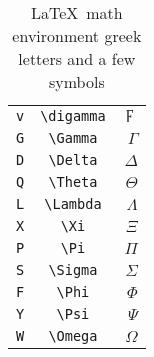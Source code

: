 \documentclass[a4paper,11pt]{scrartcl}
\begin{document}
\begin{table}[tb]
\begin{center}
\begin{tabular}{lcr}
    \verb|v|                     &    \verb|\digamma|                                             &    $\digamma$  \\
    \verb|G|                     &    \verb|\Gamma|                                               &    $\Gamma$  \\
    \verb|D|                     &    \verb|\Delta|                                               &    $\Delta$  \\
    \verb|Q|                     &    \verb|\Theta|                                               &    $\Theta$  \\
    \verb|L|                     &    \verb|\Lambda|                                              &    $\Lambda$  \\
    \verb|X|                     &    \verb|\Xi|                                                  &    $\Xi$  \\
    \verb|P|                     &    \verb|\Pi|                                                  &    $\Pi$  \\
    \verb|S|                     &    \verb|\Sigma|                                               &    $\Sigma$  \\
    \verb|F|                     &    \verb|\Phi|                                                 &    $\Phi$  \\
    \verb|Y|                     &    \verb|\Psi|                                                 &    $\Psi$  \\
    \verb|W|                     &    \verb|\Omega|                                               &    $\Omega$  \\
    \hline
    \end{tabular}
  \end{center}
  \caption{ \LaTeX \ math environment greek letters and a few symbols \smiley }
\end{table}
\end{document}

